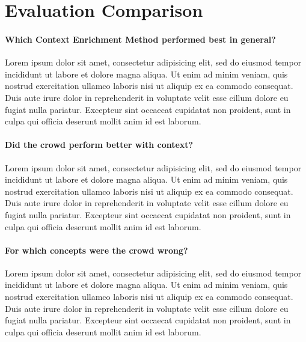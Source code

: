 \section{Evaluation Comparison}\label{sec:result_comparison}

\paragraph{Which Context Enrichment Method performed best in general?}
Lorem ipsum dolor sit amet, consectetur adipisicing elit, sed do eiusmod tempor incididunt ut labore et dolore magna aliqua. Ut enim ad minim veniam, quis nostrud exercitation ullamco laboris nisi ut aliquip ex ea commodo consequat. Duis aute irure dolor in reprehenderit in voluptate velit esse cillum dolore eu fugiat nulla pariatur. Excepteur sint occaecat cupidatat non proident, sunt in culpa qui officia deserunt mollit anim id est laborum.

\paragraph{Did the crowd perform better with context?}
Lorem ipsum dolor sit amet, consectetur adipisicing elit, sed do eiusmod tempor incididunt ut labore et dolore magna aliqua. Ut enim ad minim veniam, quis nostrud exercitation ullamco laboris nisi ut aliquip ex ea commodo consequat. Duis aute irure dolor in reprehenderit in voluptate velit esse cillum dolore eu fugiat nulla pariatur. Excepteur sint occaecat cupidatat non proident, sunt in culpa qui officia deserunt mollit anim id est laborum.

\paragraph{For which concepts were the crowd wrong?}
Lorem ipsum dolor sit amet, consectetur adipisicing elit, sed do eiusmod tempor incididunt ut labore et dolore magna aliqua. Ut enim ad minim veniam, quis nostrud exercitation ullamco laboris nisi ut aliquip ex ea commodo consequat. Duis aute irure dolor in reprehenderit in voluptate velit esse cillum dolore eu fugiat nulla pariatur. Excepteur sint occaecat cupidatat non proident, sunt in culpa qui officia deserunt mollit anim id est laborum.

